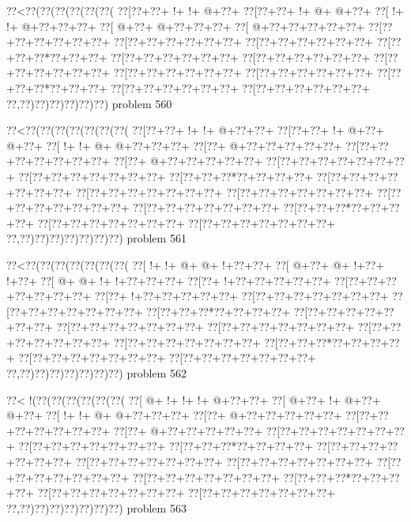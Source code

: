 \vbox{\vbox{\goo
\0??<\0??(\0??(\0??(\0??(\0??(\0??(
\0??[\0??+\0??+\- !+\- !+\- @+\0??+
\0??[\0??+\0??+\- !+\- @+\- @+\0??+
\0??[\- !+\- !+\- @+\0??+\0??+\0??+
\0??[\- @+\0??+\- @+\0??+\0??+\0??+
\0??[\- @+\0??+\0??+\0??+\0??+\0??+
\0??[\0??+\0??+\0??+\0??+\0??+\0??+
\0??[\0??+\0??+\0??+\0??+\0??+\0??+
\0??[\0??+\0??+\0??+\0??+\0??+\0??+
\0??[\0??+\0??+\0??*\0??+\0??+\0??+
\0??[\0??+\0??+\0??+\0??+\0??+\0??+
\0??[\0??+\0??+\0??+\0??+\0??+\0??+
\0??[\0??+\0??+\0??+\0??+\0??+\0??+
\0??[\0??+\0??+\0??+\0??+\0??+\0??+
\0??[\0??+\0??+\0??+\0??+\0??+\0??+
\0??[\0??+\0??+\0??*\0??+\0??+\0??+
\0??[\0??+\0??+\0??+\0??+\0??+\0??+
\0??[\0??+\0??+\0??+\0??+\0??+\0??+
\0??,\0??)\0??)\0??)\0??)\0??)\0??)
}
\hfil problem 560\hfil\break
}

\vbox{\vbox{\goo
\0??<\0??(\0??(\0??(\0??(\0??(\0??(\0??(
\0??[\0??+\0??+\- !+\- !+\- @+\0??+\0??+
\0??[\0??+\0??+\- !+\- @+\0??+\- @+\0??+
\0??[\- !+\- !+\- @+\- @+\0??+\0??+\0??+
\0??[\0??+\- @+\0??+\0??+\0??+\0??+\0??+
\0??[\0??+\0??+\0??+\0??+\0??+\0??+\0??+
\0??[\0??+\- @+\0??+\0??+\0??+\0??+\0??+
\0??[\0??+\0??+\0??+\0??+\0??+\0??+\0??+
\0??[\0??+\0??+\0??+\0??+\0??+\0??+\0??+
\0??[\0??+\0??+\0??*\0??+\0??+\0??+\0??+
\0??[\0??+\0??+\0??+\0??+\0??+\0??+\0??+
\0??[\0??+\0??+\0??+\0??+\0??+\0??+\0??+
\0??[\0??+\0??+\0??+\0??+\0??+\0??+\0??+
\0??[\0??+\0??+\0??+\0??+\0??+\0??+\0??+
\0??[\0??+\0??+\0??+\0??+\0??+\0??+\0??+
\0??[\0??+\0??+\0??*\0??+\0??+\0??+\0??+
\0??[\0??+\0??+\0??+\0??+\0??+\0??+\0??+
\0??[\0??+\0??+\0??+\0??+\0??+\0??+\0??+
\0??,\0??)\0??)\0??)\0??)\0??)\0??)\0??)
}
\hfil problem 561\hfil\break
}

\vbox{\vbox{\goo
\0??<\0??(\0??(\0??(\0??(\0??(\0??(\0??(
\0??[\- !+\- !+\- @+\- @+\- !+\0??+\0??+
\0??[\- @+\0??+\- @+\- !+\0??+\- !+\0??+
\0??[\- @+\- @+\- !+\- !+\0??+\0??+\0??+
\0??[\0??+\- !+\0??+\0??+\0??+\0??+\0??+
\0??[\0??+\0??+\0??+\0??+\0??+\0??+\0??+
\0??[\0??+\- !+\0??+\0??+\0??+\0??+\0??+
\0??[\0??+\0??+\0??+\0??+\0??+\0??+\0??+
\0??[\0??+\0??+\0??+\0??+\0??+\0??+\0??+
\0??[\0??+\0??+\0??*\0??+\0??+\0??+\0??+
\0??[\0??+\0??+\0??+\0??+\0??+\0??+\0??+
\0??[\0??+\0??+\0??+\0??+\0??+\0??+\0??+
\0??[\0??+\0??+\0??+\0??+\0??+\0??+\0??+
\0??[\0??+\0??+\0??+\0??+\0??+\0??+\0??+
\0??[\0??+\0??+\0??+\0??+\0??+\0??+\0??+
\0??[\0??+\0??+\0??*\0??+\0??+\0??+\0??+
\0??[\0??+\0??+\0??+\0??+\0??+\0??+\0??+
\0??[\0??+\0??+\0??+\0??+\0??+\0??+\0??+
\0??,\0??)\0??)\0??)\0??)\0??)\0??)\0??)
}
\hfil problem 562\hfil\break
}

\vbox{\vbox{\goo
\0??<\- !(\0??(\0??(\0??(\0??(\0??(\0??(
\0??[\- @+\- !+\- !+\- !+\- @+\0??+\0??+
\0??[\- @+\0??+\- !+\- @+\0??+\- @+\0??+
\0??[\- !+\- !+\- @+\- @+\0??+\0??+\0??+
\0??[\0??+\- @+\0??+\0??+\0??+\0??+\0??+
\0??[\0??+\0??+\0??+\0??+\0??+\0??+\0??+
\0??[\0??+\- @+\0??+\0??+\0??+\0??+\0??+
\0??[\0??+\0??+\0??+\0??+\0??+\0??+\0??+
\0??[\0??+\0??+\0??+\0??+\0??+\0??+\0??+
\0??[\0??+\0??+\0??*\0??+\0??+\0??+\0??+
\0??[\0??+\0??+\0??+\0??+\0??+\0??+\0??+
\0??[\0??+\0??+\0??+\0??+\0??+\0??+\0??+
\0??[\0??+\0??+\0??+\0??+\0??+\0??+\0??+
\0??[\0??+\0??+\0??+\0??+\0??+\0??+\0??+
\0??[\0??+\0??+\0??+\0??+\0??+\0??+\0??+
\0??[\0??+\0??+\0??*\0??+\0??+\0??+\0??+
\0??[\0??+\0??+\0??+\0??+\0??+\0??+\0??+
\0??[\0??+\0??+\0??+\0??+\0??+\0??+\0??+
\0??,\0??)\0??)\0??)\0??)\0??)\0??)\0??)
}
\hfil problem 563\hfil\break
}

